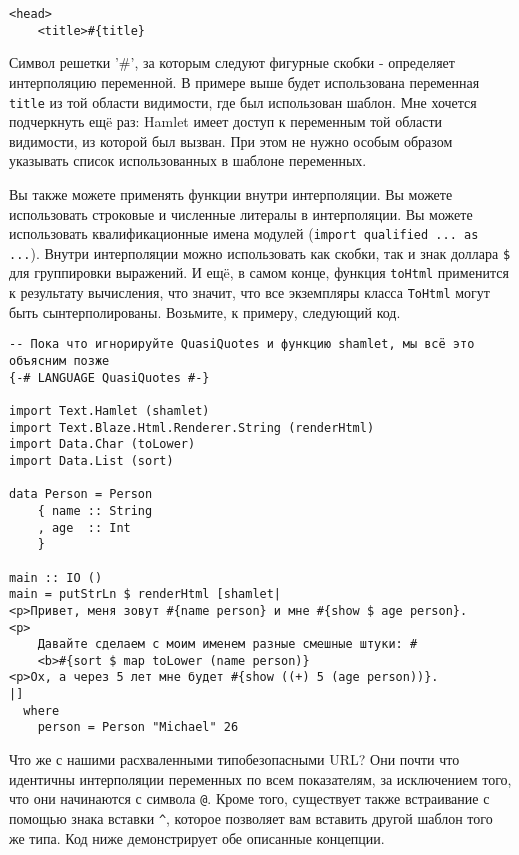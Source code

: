 \begin{lstlisting}
<head>
    <title>#{title}
\end{lstlisting}

Символ решетки '#', за которым следуют фигурные скобки - определяет интерполяцию
переменной. В примере выше будет использована переменная \lstinline!title! из той
области видимости, где был использован шаблон. Мне хочется подчеркнуть ещë раз:
Hamlet имеет доступ к переменным той области видимости, из которой был вызван.
При этом не нужно особым образом указывать список использованных в шаблоне переменных.

Вы также можете применять функции внутри интерполяции. Вы можете использовать
строковые и численные литералы в интерполяции. Вы можете использовать 
квалификационные имена модулей (\lstinline!import qualified ... as ...!). Внутри
интерполяции можно использовать как скобки, так и знак доллара \texttt{\$}
для группировки выражений. И ещë, в самом конце, функция \lstinline!toHtml!
применится к результату вычисления, что значит, что все экземпляры класса 
\lstinline!ToHtml! могут быть сынтерполированы. Возьмите, к примеру, следующий код.

\begin{lstlisting}
-- Пока что игнорируйте QuasiQuotes и функцию shamlet, мы всë это объясним позже
{-# LANGUAGE QuasiQuotes #-}

import Text.Hamlet (shamlet)
import Text.Blaze.Html.Renderer.String (renderHtml)
import Data.Char (toLower)
import Data.List (sort)

data Person = Person
    { name :: String
    , age  :: Int
    }

main :: IO ()
main = putStrLn $ renderHtml [shamlet|
<p>Привет, меня зовут #{name person} и мне #{show $ age person}.
<p>
    Давайте сделаем с моим именем разные смешные штуки: #
    <b>#{sort $ map toLower (name person)}
<p>Ох, а через 5 лет мне будет #{show ((+) 5 (age person))}.
|]
  where
    person = Person "Michael" 26
\end{lstlisting}

Что же с нашими расхваленными типобезопасными URL? Они почти что идентичны
интерполяции переменных по всем показателям, за исключением того, что они
начинаются с символа \texttt{@}. Кроме того, существует также встраивание с помощью
знака вставки \texttt{^}, которое позволяет вам вставить другой шаблон того же типа.
Код ниже демонстрирует обе описанные концепции.

